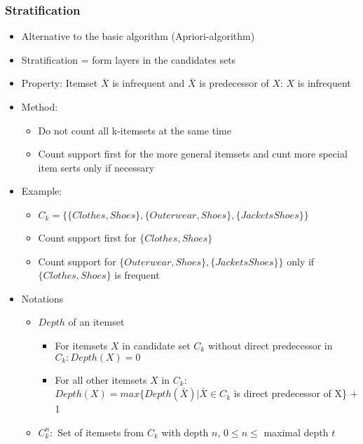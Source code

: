 \documentclass[../notes.tex]{subfiles}
\begin{document}
\subsubsection{Stratification}
\begin{itemize}
  \item Alternative to the basic algorithm (Apriori-algorithm)
  \item Stratification = form layers in the candidates sets
  \item Property: Itemset $\bar{X}$ is infrequent and $\bar{X}$ is predecessor of $X$: $X$ is infrequent

  \item Method:
    \begin{itemize}
      \item Do not count all k-itemsets at the same time
      \item Count support first for the more general itemsets and cunt more special item serts only if necessary
    \end{itemize}

  \item Example:
   \begin{itemize}
      \item $C_k = \{\{Clothes, Shoes\}, \{Outerwear, Shoes\}, \{Jackets Shoes\}\}$
      \item Count support first for $\{Clothes, Shoes\}$
      \item Count support for $\{Outerwear, Shoes\}, \{Jackets Shoes\}\}$ only if $\{Clothes, Shoes\}$ is frequent
    \end{itemize}

  \item Notations
    \begin{itemize}
      \item $Depth$ of an itemset
        \begin{itemize}
          \item For itemsets $X$ in candidate set $C_k$ without direct predecessor in $C_k: Depth(X) = 0$
          \item For all other itemsets $X$ in $C_k$: \\ $Depth(X) = max\{Depth(\bar{X}) | \bar{X} \in C_k $ is direct predecessor of X\} + 1
        \end{itemize}
      \item $C_k^n:$ Set of itemsets from $C_k$ with depth $n$, $0 \le n \le$ maximal depth $t$
    \end{itemize} 


\end{itemize}
\end{document}
